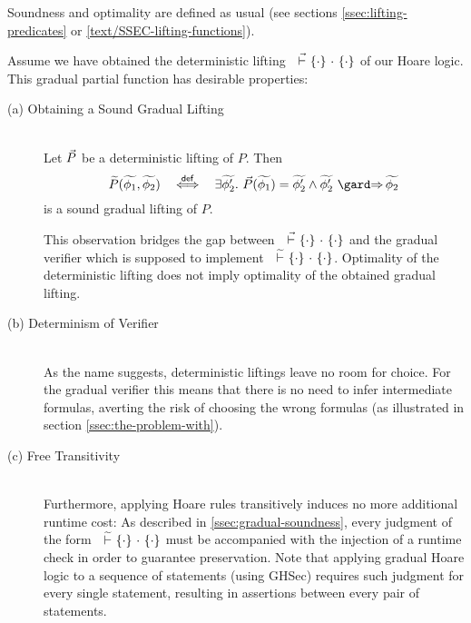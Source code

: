 Soundness and optimality are defined as usual (see sections \ref{ssec:lifting-predicates} or \ref{text/SSEC-lifting-functions}).

Assume we have obtained the deterministic lifting ${~} \,\,\vec{\vdash}\,\, \{{\cdot}\} ~{\cdot}~ \{{\cdot}\}$ of our Hoare logic.
This gradual partial function has desirable properties:
\begin{description}
    \item[(a) Obtaining a Sound Gradual Lifting]
    \begin{lemma}~\\
        \label{lem:det2grad}
        Let $\vec{P}$ be a deterministic lifting of $P$.
        Then
        \begin{displaymath}
        \grad{P}(\grad{\phi_1}, \grad{\phi_2}) ~~\defiff~~ \exists \grad{\phi_2'}.~ \dgrad{P}(\grad{\phi_1}) = \grad{\phi_2'} \wedge \gphiImplies {\grad{\phi_2'}} {\grad{\phi_2}}
        \end{displaymath}
        is a sound gradual lifting of $P$.
    \end{lemma}
    
    This observation bridges the gap between ${~} \,\,\vec{\vdash}\,\, \{{\cdot}\} ~{\cdot}~ \{{\cdot}\}$ and the gradual verifier which is supposed to implement ${~} \,\,\widetilde{\vdash}\,\, \{{\cdot}\} ~{\cdot}~ \{{\cdot}\}$.
    Optimality of the deterministic lifting does not imply optimality of the obtained gradual lifting.
    
    \item[(b) Determinism of Verifier]~\\
    As the name suggests, deterministic liftings leave no room for choice.
    For the gradual verifier this means that there is no need to infer intermediate formulas, averting the risk of choosing the wrong formulas (as illustrated in section \ref{ssec:the-problem-with}).
    
    \item[(c) Free Transitivity]~\\
    Furthermore, applying Hoare rules transitively induces no more additional runtime cost:
    As described in \ref{ssec:gradual-soundness}, every judgment of the form ${~} \,\,\widetilde{\vdash}\,\, \{{\cdot}\} ~{\cdot}~ \{{\cdot}\}$ must be accompanied with the injection of a runtime check in order to guarantee preservation.
    Note that applying gradual Hoare logic to a sequence of statements (using GHSec) requires such judgment for every single statement, resulting in assertions between every pair of statements.
    

\end{description}
